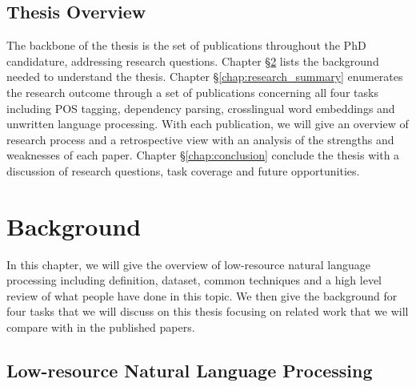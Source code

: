 \documentclass[12pt,twoside,final,hidelinks]{ltthesis}
\theoremstyle{definition}
\begin{document}
\section{Thesis Overview}
The backbone of the thesis is the set of publications throughout the PhD candidature, addressing research questions. 
Chapter \S\ref{chap:background} lists the background needed to understand the thesis. Chapter \S\ref{chap:research_summary} enumerates the research outcome 
through a set of publications concerning all four tasks including POS tagging, dependency parsing, crosslingual word embeddings and unwritten language processing. 
With each publication, we will give an overview of research process and a retrospective view with an analysis of the strengths and weaknesses of each paper. Chapter \S\ref{chap:conclusion} conclude the thesis with a discussion of research questions, task coverage and future opportunities. 


%

\chapter{Background}
\label{chap:background}
In this chapter, we will give the overview of low-resource natural language processing including definition, dataset, common techniques and a high level review of what people have done in this topic. We then give the background for four tasks that we will discuss on this thesis focusing on related work that we will compare with in the published papers. 

\section{Low-resource Natural Language Processing}
\end{document}
